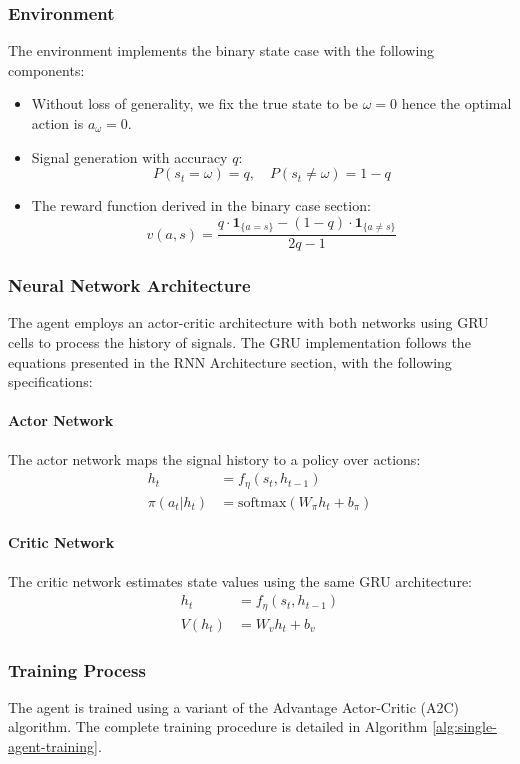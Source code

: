 \subsubsection*{Environment}
The environment implements the binary state case with the following components:

\begin{itemize}
    \item Without loss of generality, we fix the true state to be $\omega = 0$ hence the optimal action is $a_\omega = 0$.
    \item Signal generation with accuracy $q$:
    \[
        P(s_t = \omega) = q, \quad P(s_t \neq \omega) = 1-q
    \]
    \item The reward function derived in the binary case section:
    \[
        v(a,s) = \frac{q \cdot \mathbf{1}_{\{a = s\}} - (1-q) \cdot \mathbf{1}_{\{a \neq s\}}}{2q-1}
    \]
\end{itemize}

\subsubsection*{Neural Network Architecture}
The agent employs an actor-critic architecture with both networks using GRU cells to process the history of signals. The GRU implementation follows the equations presented in the RNN Architecture section, with the following specifications:

\paragraph{Actor Network}
The actor network maps the signal history to a policy over actions:
\begin{align*}
    h_t &= f_{\eta}(s_t, h_{t-1}) \\
    \pi(a_t|h_t) &= \text{softmax}(W_\pi h_t + b_\pi)
\end{align*}

\paragraph{Critic Network}
The critic network estimates state values using the same GRU architecture:
\begin{align*}
    h_t &= f_{\eta}(s_t, h_{t-1}) \\
    V(h_t) &= W_v h_t + b_v
\end{align*}

\subsubsection*{Training Process}
The agent is trained using a variant of the Advantage Actor-Critic (A2C) algorithm. The complete training procedure is detailed in Algorithm \ref{alg:single-agent-training}.

